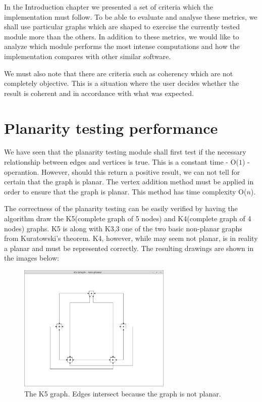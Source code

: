 In the Introduction chapter we presented a set of criteria which the implementation must follow.
To be able to evaluate and analyse these metrics, we shall use particular graphs which are shaped to exercise 
the currently tested module more than the others. In addition to these metrics, we would like to analyze 
which module performs the most intense computations and how the implementation compares with other 
similar software.

We must also note that there are criteria such as coherency which are not completely objective. This is a 
situation where the user decides whether the result is coherent and in accordance with what was expected.

\section{Planarity testing performance}

We have seen that the planarity testing module shall first test if the necessary relationship between 
edges and vertices is true. This is a constant time - O(${1}$) - operantion. However, should this 
return a positive result, we can not tell for certain that the graph is planar. The vertex addition method 
must be applied in order to ensure that the graph is planar. This method has time complexity O(${n}$).

The correctness of the planarity testing can be easily verified by having the algorithm draw the K5(complete 
graph of 5 nodes) and K4(complete graph of 4 nodes) graphs. K5 is along with K3,3 one of the two basic 
non-planar graphs from Kuratowski's theorem. K4, however, while may seem not planar, is in reality a planar 
and must be represented correctly. The resulting drawings are shown in the images below:

\begin{figure}[ht] \centering
\includegraphics[width=0.65\textwidth]{img/results/k5graph.png}
\caption{The K5 graph. Edges intersect because the graph is not planar.} \end{figure}

